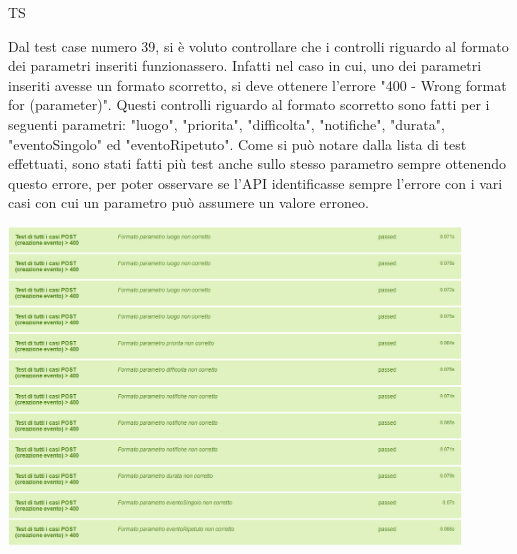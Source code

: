 \begin{listaPersonale}{TS}
\begin{center}
                \end{center}
                Dal test case numero 39, si è voluto controllare che i controlli riguardo al formato dei parametri inseriti funzionassero. Infatti nel caso in cui, uno dei parametri inseriti avesse un formato scorretto, si deve ottenere l'errore "400 - Wrong format for (parameter)". Questi controlli riguardo al formato scorretto sono fatti per i seguenti parametri: "luogo", "priorita", "difficolta", "notifiche", "durata", "eventoSingolo" ed "eventoRipetuto". Come si può notare dalla lista di test effettuati, sono stati fatti più test anche sullo stesso parametro sempre ottenendo questo errore, per poter osservare se l'API identificasse sempre l'errore con i vari casi con cui un parametro può assumere un valore erroneo.
                \begin{center}
                        \includegraphics[width=0.9\textwidth, height=0.4\textheight]{img/png/tests/EventoPost/400_wrongFormat_PostEvento.png}
                \end{center}

\end{listaPersonale}
